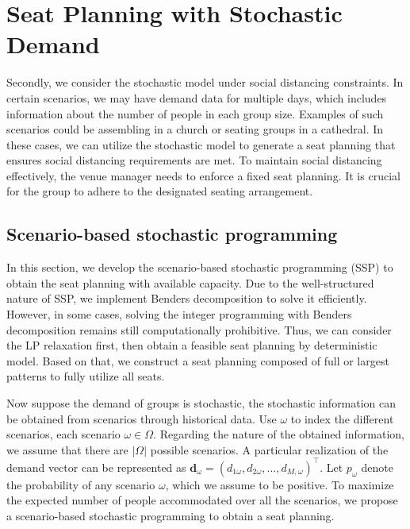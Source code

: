 \section{Seat Planning with Stochastic Demand}\label{sec_seat_planning}


Secondly, we consider the stochastic model under social distancing constraints. In certain scenarios, we may have demand data for multiple days, which includes information about the number of people in each group size. Examples of such scenarios could be assembling in a church or seating groups in a cathedral. In these cases, we can utilize the stochastic model to generate a seat planning that ensures social distancing requirements are met. To maintain social distancing effectively, the venue manager needs to enforce a fixed seat planning. It is crucial for the group to adhere to the designated seating arrangement.


\subsection*{Scenario-based stochastic programming}
In this section, we develop the scenario-based stochastic programming (SSP) to obtain the seat planning with available capacity. Due to the well-structured nature of SSP, we implement Benders decomposition to solve it efficiently. However, in some cases, solving the integer programming with Benders decomposition remains still computationally prohibitive. Thus, we can consider the LP relaxation first, then obtain a feasible seat planning by deterministic model. Based on that, we construct a seat planning composed of full or largest patterns to fully utilize all seats.

Now suppose the demand of groups is stochastic, the stochastic information can be obtained from scenarios through historical data. Use $\omega$ to index the different scenarios, each scenario $\omega \in \Omega$. Regarding the nature of the obtained information, we assume that there are $|\Omega|$ possible scenarios. A particular realization of the demand vector can be represented as $\mathbf{d}_\omega = (d_{1\omega},d_{2\omega},\ldots,d_{M,\omega})^{\intercal}$. Let $p_{\omega}$ denote the probability of any scenario $\omega$, which we assume to be positive. To maximize the expected number of people accommodated over all the scenarios, we propose a scenario-based stochastic programming to obtain a seat planning.

